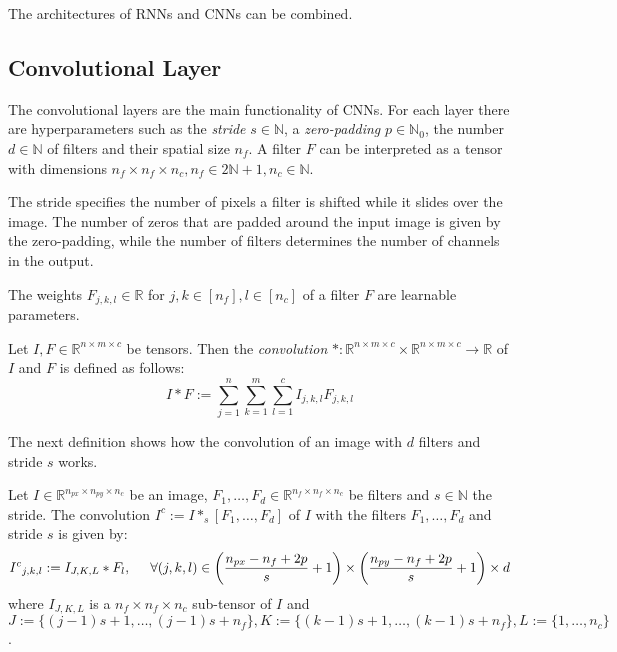 \documentclass[a4paper, 12pt]{scrreprt} %
\begin{document}
The architectures of \acp{RNN} and \acp{CNN} can be combined.

\subsection{Convolutional Layer}
\label{subsec:CL}
The convolutional layers are the main functionality of \acp{CNN}. For each layer there are hyperparameters such as the \emph{stride} $s \in \mathbb{N}$, a \emph{zero-padding} $p \in \mathbb{N}_0$, the number $d\in \mathbb{N}$ of  filters and their spatial size $n_f$. A filter $F$ can be interpreted as a tensor with dimensions $n_f \times n_f \times n_c, n_f \in 2\mathbb{N}+1, n_c \in \mathbb{N}$. 

The stride specifies the number of pixels a filter is shifted while it slides over the image. The number of zeros that are padded around the input image is given by the zero-padding, while the number of filters determines the number of channels in the output.

The weights $F_{j,k,l} \in \mathbb{R} $ for $j,k \in [n_f], l \in [n_c]$ of a filter $F$ are learnable parameters.\newline

\begin{definition}[Convolution]
Let $I,F \in \mathbb{R}^{n\times m \times c}$ be tensors. Then the \emph{convolution} $*:\mathbb{R}^{n\times m \times c}\times \mathbb{R}^{n\times m \times c} \to \mathbb{R}$ of $I$ and $F$ is defined as follows:
\begin{equation*}
I*F := \sum\limits_{j=1}^{n} \sum\limits_{k=1}^{m} \sum\limits_{l=1}^{c} I_{j,k,l}F_{j,k,l}
\end{equation*}
\end{definition}

The next definition shows how the convolution of an image with $d$ filters and stride $s$ works.
\begin{definition}
Let $I \in \mathbb{R}^{n_{px} \times n_{py} \times n_c}$ be an image, $F_1,\dots, F_d \in \mathbb{R}^{n_f \times n_f \times n_c}$ be  filters and $s \in \mathbb{N}$ the stride. The convolution $I^c := I *_s [F_1, \dots, F_d]$ of $I$ with the filters $F_1,\dots, F_d$ and stride $s$ is given by: 
\begin{equation*}
{I^c}_{j,k,l} := I_{J,K,L} * F_l, \hspace{0.5cm}\forall (j,k,l) \in \left(\frac{n_{px}-n_f+2p}{s}+1\right)\times \left(\frac{n_{py}-n_f+2p}{s}+1\right)  \times d
\end{equation*}
where $I_{J,K,L}$ is a $n_f \times n_f \times n_c$ sub-tensor of $I$ and $J:=\{(j-1)s+1,\dots,(j-1)s+n_f\}, K:=\{(k-1)s+1,\dots,(k-1)s+n_f\}, L:=\{1, \dots, n_c\}$.
\end{definition}
\end{document}
